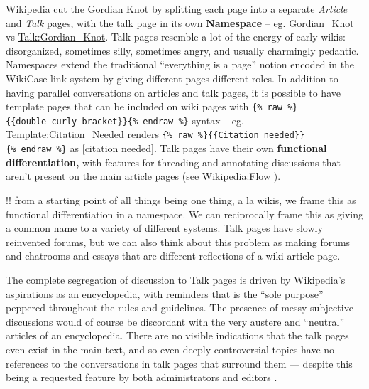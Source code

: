 \documentclass[10pt]{article}
\begin{document}
\begin{multicols}{2}
Wikipedia cut the Gordian Knot by splitting each page into a separate
\emph{Article} and \emph{Talk} pages, with the talk page in its own
\textbf{Namespace} -- eg.
\href{https://en.wikipedia.org/wiki/Gordian_Knot}{Gordian\_Knot} vs
\href{https://en.wikipedia.org/wiki/Talk:Gordian_Knot}{Talk:Gordian\_Knot}.
Talk pages resemble a lot of the energy of early wikis: disorganized,
sometimes silly, sometimes angry, and usually charmingly pedantic.
Namespaces extend the traditional ``everything is a page'' notion
encoded in the WikiCase link system by giving different pages different
roles. In addition to having parallel conversations on articles and talk
pages, it is possible to have template pages that can be included on
wiki pages with
\texttt{\{\%\ raw\ \%\}\{\{double\ curly\ bracket\}\}\{\%\ endraw\ \%\}}
syntax -- eg.
\href{https://en.wikipedia.org/wiki/Template:Citation_needed}{Template:Citation\_Needed}
renders
\texttt{\{\%\ raw\ \%\}\{\{Citation\ needed\}\}\{\%\ endraw\ \%\}} as
{[}citation needed{]}. Talk pages have their own \textbf{functional
differentiation,} with features for threading and annotating discussions
that aren't present on the main article pages (see
\href{https://en.wikipedia.org/wiki/Wikipedia:Flow}{Wikipedia:Flow} \cite{WikipediaFlow2021} ).

!! from a starting point of all things being one thing, a la wikis, we
frame this as functional differentiation in a namespace. We can
reciprocally frame this as giving a common name to a variety of
different systems. Talk pages have slowly reinvented forums, but we can
also think about this problem as making forums and chatrooms and essays
that are different reflections of a wiki article page.

The complete segregation of discussion to Talk pages is driven by
Wikipedia's aspirations as an encyclopedia, with reminders that is the
``\href{https://en.wikipedia.org/wiki/Wikipedia:Don't_lose_the_thread\#Move_to_the_article_talk_page}{sole
purpose}'' peppered throughout the rules and guidelines. The presence of
messy subjective discussions would of course be discordant with the very
austere and ``neutral'' articles of an encyclopedia. There are no
visible indications that the talk pages even exist in the main text, and
so even deeply controversial topics have no references to the
conversations in talk pages that surround them --- despite this being a
requested feature by both administrators and editors \cite{schneiderUnderstandingImprovingWikipedia2011} .


\end{multicols}
\end{document}
